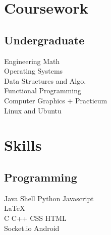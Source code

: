 \documentclass[]{deedy-resume-openfont}
\begin{document}
\begin{minipage}[t]{0.33\textwidth}

\section{Coursework}

\subsection{Undergraduate}
Engineering Math \\
Operating Systems \\
Data Structures and Algo. \\
Functional Programming \\
Computer Graphics + Practicum \\
Linux and Ubuntu \\


\section{Skills}
\subsection{Programming}
Java \textbullet{}   Shell \textbullet{} Python \textbullet{} Javascript \\ \textbullet{} \LaTeX\ \\ 
C \textbullet{} C++ \textbullet{} CSS  \textbullet{} HTML \\
\textbullet{}
Socket.io  \textbullet{} Android 
\sectionsep

%
%

\end{minipage} 
\hfill
\end{document}
